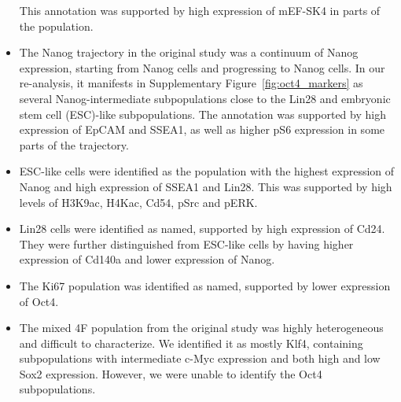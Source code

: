 \documentclass{article}
\begin{document}
\begin{itemize}
        This annotation was supported by high expression of mEF-SK4 in parts of the population.
    \item The Nanog\hi{} trajectory in the original study was a continuum of Nanog expression, starting from Nanog\lo{} cells and progressing to Nanog\hi{} cells.
        In our re-analysis, it manifests in Supplementary Figure~\ref{fig:oct4_markers} as several Nanog-intermediate subpopulations close to the Lin28\hi{} and embryonic stem cell (ESC)-like subpopulations.
        The annotation was supported by high expression of EpCAM and SSEA1, as well as higher pS6 expression in some parts of the trajectory.
    \item ESC-like cells were identified as the population with the highest expression of Nanog and high expression of SSEA1 and Lin28.
        This was supported by high levels of H3K9ac, H4Kac, Cd54, pSrc and pERK.
    \item Lin28\hi{} cells were identified as named, supported by high expression of Cd24.
They were further distinguished from ESC-like cells by having higher expression of Cd140a and lower expression of Nanog.
    \item The Ki67\hi{} population was identified as named, supported by lower expression of Oct4.
    \item The mixed 4F population from the original study was highly heterogeneous and difficult to characterize.
We identified it as mostly Klf4\lo{}, containing subpopulations with intermediate c-Myc expression and both high and low Sox2 expression.
However, we were unable to identify the Oct4\lo{} subpopulations.
\end{itemize}
\end{document}
